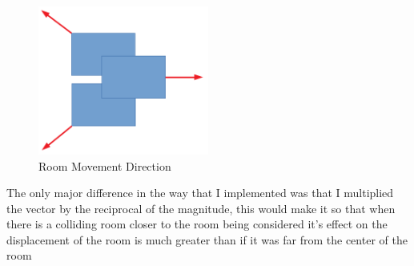 \documentclass{article}
\begin{document}
\begin{figure}[h]
\begin{center}
\includegraphics[width = 0.5\textwidth]{sep_vecs_rects}
\caption{\cite{Dis_Alg} Room Movement Direction}
\end{center}
\label{Room Movement Direction}
\end{figure}

The only major difference in the way that I implemented was that I multiplied the vector by the reciprocal of the magnitude, this would make it so that when there is a colliding room closer to the room being considered it's effect on the displacement of the room is much greater than if it was far from the center of the room
\end{document}
